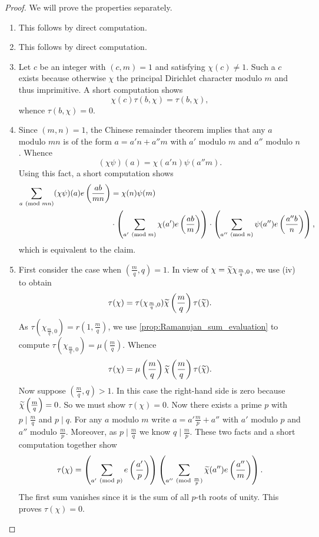     \begin{proof}
      We will prove the properties separately.
      \begin{enumerate}[label*=(\roman*)]
        \item This follows by direct computation.
        \item This follows by direct computation.
        \item Let \(c\) be an integer with \((c,m) = 1\) and satisfying \(\chi(c) \neq 1\). Such a \(c\) exists because otherwise \(\chi\) the principal Dirichlet character modulo \(m\) and thus imprimitive. A short computation shows
        \[
          \chi(c)\tau(b,\chi) = \tau(b,\chi),
        \]
        whence \(\tau(b,\chi) = 0\).
        \item Since \((m,n) = 1\), the Chinese remainder theorem implies that any \(a\) modulo \(mn\) is of the form \(a = a'n+a''m\) with \(a'\) modulo \(m\) and \(a''\) modulo \(n\). Whence
        \[
          (\chi\psi)(a) = \chi(a'n)\psi(a''m).
        \]
        Using this fact, a short computation shows
        \begin{align*}
          \sum_{a \ (\mathrm{mod}\text{ }mn)}(\chi\psi)(a)e\left(\frac{ab}{mn}\right) &= \chi(n)\psi(m) \\
          &\cdot \left(\sum_{a' \ (\mathrm{mod}\text{ }m)}\chi(a')e\left(\frac{ab}{m}\right)\right)\cdot \left(\sum_{a'' \ (\mathrm{mod}\text{ }n)}\psi(a'')e\left(\frac{a''b}{n}\right)\right),
        \end{align*}
        which is equivalent to the claim.
        \item First consider the case when \(\left(\frac{m}{q},q\right) = 1\). In view of \(\chi = \widetilde{\chi}\chi_{\frac{m}{q},0}\), we use (iv) to obtain
        \[
          \tau(\chi) = \tau(\chi_{\frac{m}{q},0})\widetilde{\chi}\left(\frac{m}{q}\right)\tau(\widetilde{\chi}).
        \]
        As \(\tau(\chi_{\frac{m}{q},0}) = r\left(1,\frac{m}{q}\right)\), we use \cref{prop:Ramanujan_sum_evaluation} to compute \(\tau(\chi_{\frac{m}{q},0}) = \mu\left(\frac{m}{q}\right)\). Whence
        \[
          \tau(\chi) = \mu\left(\frac{m}{q}\right)\widetilde{\chi}\left(\frac{m}{q}\right)\tau(\widetilde{\chi}).
        \]
        Now suppose \(\left(\frac{m}{q},q\right) > 1\). In this case the right-hand side is zero because \(\widetilde{\chi}\left(\frac{m}{q}\right) = 0\). So we must show \(\tau(\chi) = 0\). Now there exists a prime \(p\) with \(p \mid \frac{m}{q}\) and \(p \mid q\). For any \(a\) modulo \(m\) write \(a = a'\frac{m}{p}+a''\) with \(a'\) modulo \(p\) and \(a''\) modulo \(\frac{m}{p}\). Moreover, as \(p \mid \frac{m}{q}\) we know \(q \mid \frac{m}{p}\). These two facts and a short computation together show
        \[
          \tau(\chi) = \left(\sum_{a' \ (\mathrm{mod}\text{ }p)}e\left(\frac{a'}{p}\right)\right)\left(\sum_{a'' \ (\mathrm{mod}\text{ }\frac{m}{p})}\widetilde{\chi}(a'')e\left(\frac{a''}{m}\right)\right).
        \] 
        The first sum vanishes since it is the sum of all \(p\)-th roots of unity. This proves \(\tau(\chi) = 0\).
      \end{enumerate}
    \end{proof}

